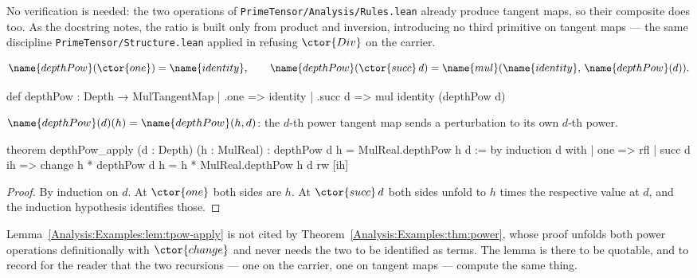 No verification is needed: the two operations of
\texttt{PrimeTensor/Analysis/Rules.lean} already produce tangent maps, so their
composite does too.  As the docstring notes, the ratio is built only from
product and inversion, introducing no third primitive on tangent maps --- the
same discipline \texttt{PrimeTensor/Structure.lean} applied in refusing
$\ctor{Div}$ on the carrier.

\begin{definition}\label{Analysis:Examples:def:tpow}
\[
  \name{depthPow}(\ctor{one}) = \name{identity},
  \qquad
  \name{depthPow}(\ctor{succ}\,d) =
    \name{mul}(\name{identity},\, \name{depthPow}(d)).
\]
\end{definition}

\begin{leancode}
def depthPow : Depth → MulTangentMap
  | .one => identity
  | .succ d => mul identity (depthPow d)
\end{leancode}

\begin{lemma}
\label{Analysis:Examples:lem:tpow-apply}
$\name{depthPow}(d)(h) = \name{depthPow}(h, d)$: the $d$-th power tangent map
sends a perturbation to its own $d$-th power.
\end{lemma}

\begin{leancode}
theorem depthPow_apply (d : Depth) (h : MulReal) :
    depthPow d h = MulReal.depthPow h d := by
  induction d with
  | one =>
      rfl
  | succ d ih =>
      change h * depthPow d h = h * MulReal.depthPow h d
      rw [ih]
\end{leancode}

\begin{proof}
By induction on $d$.  At $\ctor{one}$ both sides are $h$.  At
$\ctor{succ}\,d$ both sides unfold to $h$ times the respective value at $d$,
and the induction hypothesis identifies those.
\end{proof}

\begin{remark}\label{Analysis:Examples:rem:unused}
Lemma~\ref{Analysis:Examples:lem:tpow-apply} is not cited by
Theorem~\ref{Analysis:Examples:thm:power}, whose proof unfolds both power
operations definitionally with $\ctor{change}$ and never needs the two to be
identified as terms.  The lemma is there to be quotable, and to record for the
reader that the two recursions --- one on the carrier, one on tangent maps ---
compute the same thing.
\end{remark}

